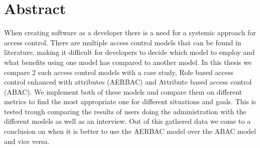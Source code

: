 \clearpage 
{} 
{}
\chapter*{Abstract}
When creating software as a developer there is a need for a systemic approach for access control.
There are multiple access control models that can be found in literature, making it difficult for developers to decide which model to employ and what benefits using one model has compared to another model.
In this thesis we compare 2 such access control models with a case study, Role based access control enhanced with attributes (AERBAC) and Attribute based access control (ABAC).
We implement both of these models and compare them on different metrics to find the most appropriate one for different situations and goals.
This is tested trough comparing the results of users doing the administration with the different models as well as an interview. 
Out of this gathered data we come to a conclusion on when it is better to use the AERBAC model over the ABAC model and vice versa.